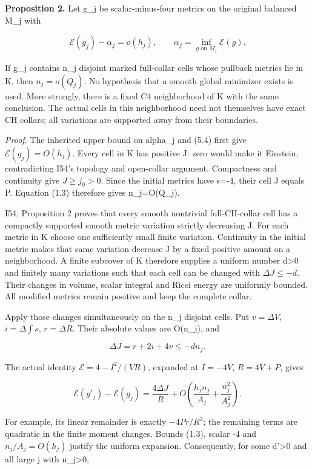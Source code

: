 \documentclass[
  10pt,
]{article}
\begin{document}
\textbf{Proposition 2.} Let g\_j be scalar-minus-four metrics on the
original balanced M\_j with

\[
 \mathcal E(g_j)-\alpha_j=o(h_j),\qquad
 \alpha_j=\inf_{g\text{ on }M_j}\mathcal E(g).
 \tag{5.4}
\]

If g\_j contains n\_j disjoint marked full-collar cells whose pullback
metrics lie in K, then \(n_j=o(Q_j)\). No hypothesis that a smooth
global minimizer exists is used. More strongly, there is a fixed C4
neighborhood of K with the same conclusion. The actual cells in this
neighborhood need not themselves have exact CH collars; all variations
are supported away from their boundaries.

\emph{Proof.} The inherited upper bound on alpha\_j and (5.4) first give
\(\mathcal E(g_j)=O(h_j)\). Every cell in K has positive J: zero would
make it Einstein, contradicting I54's topology and open-collar argument.
Compactness and continuity give \(J\ge j_0>0\). Since the initial
metrics have s=-4, their cell J equals P. Equation (1.3) therefore gives
n\_j=O(Q\_j).

I54, Proposition 2 proves that every smooth nontrivial full-CH-collar
cell has a compactly supported smooth metric variation strictly
decreasing J. For each metric in K choose one sufficiently small finite
variation. Continuity in the initial metric makes that same variation
decrease J by a fixed positive amount on a neighborhood. A finite
subcover of K therefore supplies a uniform number d\textgreater0 and
finitely many variations such that each cell can be changed with
\(\Delta J\le-d\). Their changes in volume, scalar integral and Ricci
energy are uniformly bounded. All modified metrics remain positive and
keep the complete collar.

Apply those changes simultaneously on the n\_j disjoint cells. Put
\(v=\Delta V\), \(i=\Delta\int s\), \(r=\Delta R\). Their absolute
values are O(n\_j), and

\[
 \Delta J=r+2i+4v\le-d n_j.
\]

The actual identity \(\mathcal E=4-I^2/(VR)\), expanded at \(I=-4V\),
\(R=4V+P\), gives

\[
 \mathcal E(g'_j)-\mathcal E(g_j)
 =\frac{4\Delta J}{R}
  +O\left(\frac{h_jn_j}{A_j}+\frac{n_j^2}{A_j^2}\right).
 \tag{5.5}
\]

For example, its linear remainder is exactly \(-4Pr/R^2\); the remaining
terms are quadratic in the finite moment changes. Bounds (1.3), scalar
-4 and \(n_j/A_j=O(h_j)\) justify the uniform expansion. Consequently,
for some d'\textgreater0 and all large j with n\_j\textgreater0,
\end{document}
